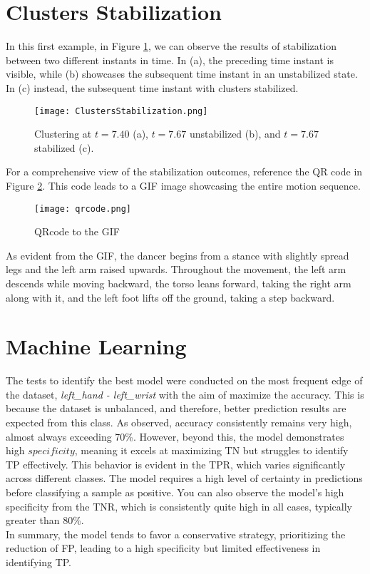 \clearpage

\section{Clusters Stabilization}
In this first example, in Figure \ref{fig:stabilization_results}, we can observe the results of stabilization between two different instants in time. 
In (a), the preceding time instant is visible, while (b) showcases the subsequent time instant in an unstabilized state. 
In (c) instead, the subsequent time instant with clusters stabilized.
\begin{figure}[H]
  \centering
  \texttt{[image: ClustersStabilization.png]}
  \caption{Clustering at $t=7.40$ (a), $t=7.67$ unstabilized (b), and $t=7.67$ stabilized (c).}
  \label{fig:stabilization_results}
\end{figure}

For a comprehensive view of the stabilization outcomes, reference the QR code in Figure \ref{fig:QRcode}. 
This code leads to a GIF image showcasing the entire motion sequence.
\begin{figure}[H]
  \centering
  \texttt{[image: qrcode.png]}
  \caption{QRcode to the GIF}
  \label{fig:QRcode}
\end{figure}

As evident from the GIF, the dancer begins from a stance with slightly spread legs and the left arm raised upwards.
Throughout the movement, the left arm descends while moving backward, the torso leans forward, taking the right arm along with it, and the left foot lifts off the ground, taking a step backward.

\clearpage

\section{Machine Learning}

The tests to identify the best model were conducted on the most frequent edge of the dataset, \textit{left\_hand - left\_wrist} with the aim of maximize the accuracy.
This is because the dataset is unbalanced, and therefore, better prediction results are expected from this class.
As observed, accuracy consistently remains very high, almost always exceeding 70\%.
However, beyond this, the model demonstrates high $specificity$, meaning it excels at maximizing TN but struggles to identify TP effectively.
This behavior is evident in the TPR, which varies significantly across different classes.
The model requires a high level of certainty in predictions before classifying a sample as positive.
You can also observe the model's high specificity from the TNR, which is consistently quite high in all cases, typically greater than 80\%. \\
In summary, the model tends to favor a conservative strategy, prioritizing the reduction of FP, leading to a high specificity but limited effectiveness in identifying TP.

